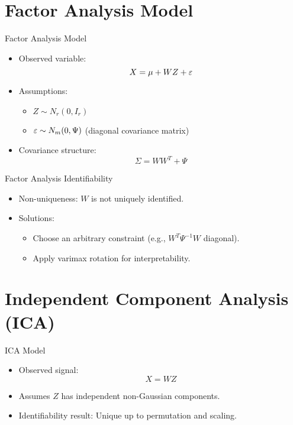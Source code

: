 \documentclass[11pt,handout,aspectratio=169]{beamer}
\begin{document}
\section{Factor Analysis Model}

\begin{frame}{Factor Analysis Model}
    \begin{itemize}
        \item Observed variable: \[ X = \mu + WZ + \varepsilon \]
        \item Assumptions:
        \begin{itemize}
            \item $Z \sim N_r(0, I_r)$
            \item $\varepsilon \sim N_m(0, \Psi)$ (diagonal covariance matrix)
        \end{itemize}
        \item Covariance structure: \[ \Sigma = WW^T + \Psi \]
    \end{itemize}
\end{frame}

\begin{frame}{Factor Analysis Identifiability}
    \begin{itemize}
        \item Non-uniqueness: $W$ is not uniquely identified.
        \item Solutions:
        \begin{itemize}
            \item Choose an arbitrary constraint (e.g., $W^T\Psi^{-1}W$ diagonal).
            \item Apply varimax rotation for interpretability.
        \end{itemize}
    \end{itemize}
\end{frame}

\section{Independent Component Analysis (ICA)}

\begin{frame}{ICA Model}
    \begin{itemize}
        \item Observed signal: \[ X = WZ \]
        \item Assumes $Z$ has independent non-Gaussian components.
        \item Identifiability result: Unique up to permutation and scaling.
    \end{itemize}
\end{frame}
\end{document}
